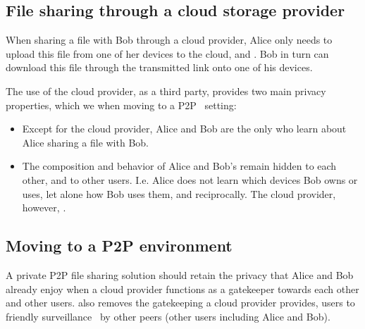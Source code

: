 
\subsection{File sharing through a cloud storage provider}

When sharing a file with Bob through a cloud provider, Alice only needs to upload this file from one of her devices to the cloud, and . Bob in turn can download this file through the transmitted link onto one of his devices.

The use of the cloud provider, as a third party,
provides two main privacy properties, which we  when
moving to a \ac{P2P}~\cite{DevilInMetadata} setting:
\begin{itemize}
\item Except for the cloud provider, Alice and Bob are the only  who learn 
about Alice sharing a file with Bob.  
\item
  The composition and behavior of Alice and Bob's \squad remain hidden to each other, and to other users. I.e. Alice does not learn which devices Bob owns or uses, let alone how Bob uses them, and reciprocally. 
The cloud provider, however, .  
\end{itemize} 

\subsection{Moving to a P2P environment}
A private P2P file sharing solution should retain
the privacy that
Alice and Bob already enjoy when a cloud provider functions
as a gatekeeper towards each other and other users.
 also removes the gatekeeping a cloud provider provides,  users to friendly surveillance~\cite{FriendlySurveillance}
by other peers (other \name users including Alice and Bob). 
 

